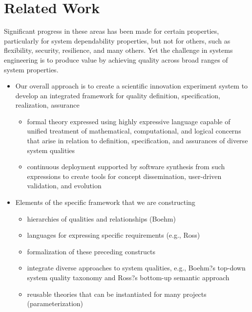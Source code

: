 \documentclass[conference]{IEEEtran}
\begin{document}
\section{Related Work}
Significant progress in these areas has been made for certain properties, particularly for system dependability properties, but not for others, such as flexibility, security, resilience, and many others. Yet the challenge in systems engineering is to produce value by achieving quality across broad ranges of system properties.
\begin{itemize}
	\item Our overall approach is to create a scientific innovation experiment system to develop an integrated framework for quality definition, specification, realization, assurance
	\begin{itemize} 
		\item formal theory expressed using highly expressive language capable of unified treatment of mathematical, computational, and logical concerns that arise in relation to definition, specification, and assurances of diverse system qualities
		\item	continuous deployment supported by software synthesis from such expressions to create tools for concept dissemination, user-driven validation, and evolution
	\end{itemize}
	\item Elements of the specific framework that we are constructing
	\begin{itemize}
		\item hierarchies of qualities and relationships (Boehm)
		\item languages for expressing specific requirements (e.g., Ross)
		\item formalization of these preceding constructs 
		\item integrate diverse approaches to system qualities, e.g., Boehm?s top-down system quality taxonomy and Ross?s bottom-up semantic approach
		\item reusable theories that can be instantiated for many projects (parameterization)
	\end{itemize}
\end{itemize}
\end{document}
